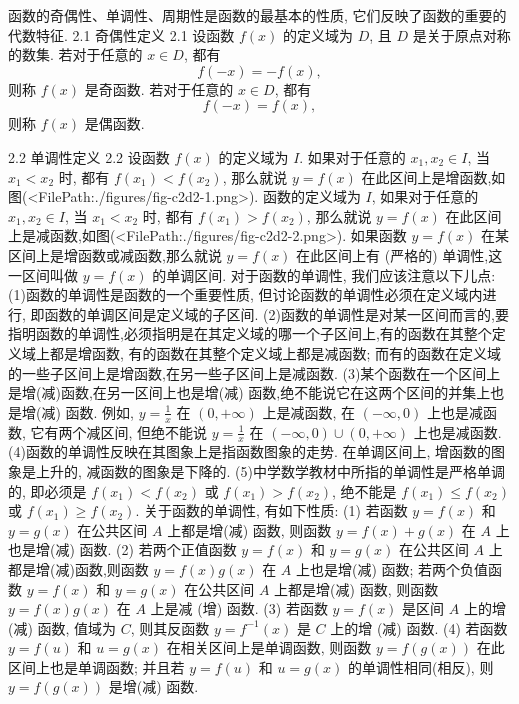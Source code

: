 
函数的奇偶性、单调性、周期性是函数的最基本的性质, 它们反映了函数的重要的代数特征.
2.1 奇偶性定义 2.1 设函数 $f(x)$ 的定义域为 $D$, 且 $D$ 是关于原点对称的数集.
若对于任意的 $x \in D$, 都有
$$
f(-x)=-f(x),
$$
则称 $f(x)$ 是奇函数.
若对于任意的 $x \in D$, 都有
$$
f(-x)=f(x),
$$
则称 $f(x)$ 是偶函数.



2.2 单调性定义 2.2 设函数 $f(x)$ 的定义域为 $I$. 如果对于任意的 $x_1, x_2 \in I$, 当$x_1<x_2$ 时, 都有 $f\left(x_1\right)<f\left(x_2\right)$, 那么就说 $y=f(x)$ 在此区间上是增函数,如图(<FilePath:./figures/fig-c2d2-1.png>).
函数的定义域为 $I$, 如果对于任意的 $x_1, x_2 \in I$, 当 $x_1<x_2$ 时, 都有 $f\left(x_1\right)>f\left(x_2\right)$, 那么就说 $y=f(x)$ 在此区间上是减函数,如图(<FilePath:./figures/fig-c2d2-2.png>).
如果函数 $y=f(x)$ 在某区间上是增函数或减函数,那么就说 $y=f(x)$ 在此区间上有 (严格的) 单调性,这一区间叫做 $y=f(x)$ 的单调区间.
对于函数的单调性, 我们应该注意以下儿点:
(1)函数的单调性是函数的一个重要性质, 但讨论函数的单调性必须在定义域内进行, 即函数的单调区间是定义域的子区间.
(2)函数的单调性是对某一区间而言的,要指明函数的单调性,必须指明是在其定义域的哪一个子区间上,有的函数在其整个定义域上都是增函数, 有的函数在其整个定义域上都是减函数; 而有的函数在定义域的一些子区间上是增函数,在另一些子区间上是减函数.
(3)某个函数在一个区间上是增(减)函数,在另一区间上也是增(减) 函数,绝不能说它在这两个区间的并集上也是增(减) 函数.
例如, $y=\frac{1}{x}$ 在 $(0,+\infty)$ 上是减函数, 在 $(-\infty, 0)$ 上也是减函数, 它有两个减区间, 但绝不能说 $y=\frac{1}{x}$ 在 $(-\infty, 0) \cup(0,+\infty)$ 上也是减函数.
(4)函数的单调性反映在其图象上是指函数图象的走势.
在单调区间上, 增函数的图象是上升的, 减函数的图象是下降的.
(5)中学数学教材中所指的单调性是严格单调的, 即必须是 $f\left(x_1\right)< f\left(x_2\right)$ 或 $f\left(x_1\right)>f\left(x_2\right)$, 绝不能是 $f\left(x_1\right) \leqslant f\left(x_2\right)$ 或 $f\left(x_1\right) \geqslant f\left(x_2\right)$.
关于函数的单调性, 有如下性质:
(1) 若函数 $y=f(x)$ 和 $y=g(x)$ 在公共区间 $A$ 上都是增(减) 函数, 则函数 $y=f(x)+g(x)$ 在 $A$ 上也是增(减) 函数.
(2) 若两个正值函数 $y=f(x)$ 和 $y=g(x)$ 在公共区间 $A$ 上都是增(减)函数,则函数 $y=f(x) g(x)$ 在 $A$ 上也是增(减) 函数;
若两个负值函数 $y=f(x)$ 和 $y=g(x)$ 在公共区间 $A$ 上都是增(减) 函数, 则函数 $y=f(x) g(x)$ 在 $A$ 上是减 (增) 函数.
(3) 若函数 $y=f(x)$ 是区间 $A$ 上的增(减) 函数, 值域为 $C$, 则其反函数 $y=f^{-1}(x)$ 是 $C$ 上的增 (减) 函数.
(4) 若函数 $y=f(u)$ 和 $u=g(x)$ 在相关区间上是单调函数, 则函数 $y= f(g(x))$ 在此区间上也是单调函数; 并且若 $y=f(u)$ 和 $u=g(x)$ 的单调性相同(相反), 则 $y=f(g(x))$ 是增(减) 函数.



